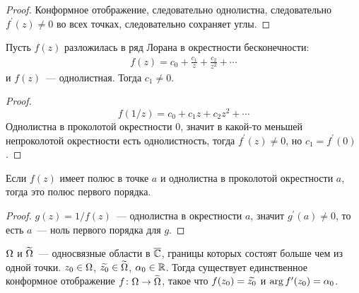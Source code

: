 \begin{proof}
    Конформное отображение, следовательно однолистна,
    следовательно $f^\prime(z) \ne 0$ во всех точках,
    следовательно сохраняет углы.
\end{proof}

\begin{consequence}
    Пусть $f(z)$ разложилась в ряд Лорана
    в окрестности бесконечности: 
    \begin{gather*}
        f(z) = c_0 + \frac{c_1}{z} + \frac{c_2}{z^2} + \cdots
    \end{gather*}
    и $f(z)$~--- однолистная.
    Тогда $c_1 \ne 0$.
\end{consequence}

\begin{proof}
    $$f(1/z) = c_0 + c_1z + c_2z^2 + \cdots$$
    Однолистна в проколотой окрестности $0$,
    значит в какой-то меньшей непроколотой окрестности
    есть однолистность, тогда $f^\prime(z) \ne 0$,
    но $c_1 = f^\prime(0)$.
\end{proof}

\begin{consequence}
    Если $f(z)$ имеет полюс в точке $a$ и однолистна
    в проколотой окрестности $a$, тогда это полюс первого порядка.
\end{consequence}

\begin{proof}
    $g(z) = 1/f(z)$~--- однолистна в окрестности
    $a$, значит $g^\prime(a) \ne 0$, то есть $a$~--- ноль первого порядка
    для $g$.
\end{proof}

\begin{theorem}
    $\Omega$ и $\widetilde{\Omega}$~--- односвязные области в $\overline{\mathbb{C}}$, границы
    которых состоят больше чем из одной точки.
    $z_0 \in \Omega$, $\widetilde{z_0} \in \widetilde{\Omega}$, $\alpha_0 \in \mathbb{R}$.
    Тогда существует единственное конформное отображение
    $f \colon \Omega \to \widetilde{\Omega}$, такое что $f(z_0) = \widetilde{z_0}$
    и $\arg f^\prime(z_0) = \alpha_0$.
\end{theorem}

\newpage


